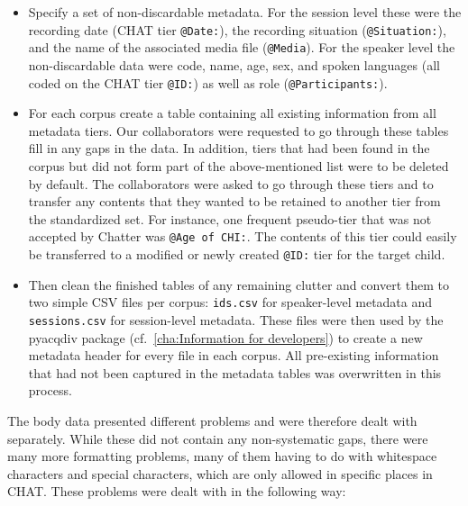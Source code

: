 \documentclass[a4paper, 11pt]{book}
\begin{document}
\begin{itemize}
	\item Specify a set of non-discardable metadata. For the session level these were the recording date (CHAT tier \texttt{@Date:}), the recording situation (\texttt{@Situation:}), and the name of the associated media file
		(\texttt{@Media}). For the speaker level the non-discardable data were code, name, age, sex, and spoken languages (all coded on the CHAT tier \texttt{@ID:}) as well as role (\texttt{@Participants:}). 
	\item For each corpus create a table containing all existing information from all metadata tiers. Our collaborators were requested to go through these tables fill in any gaps in the data. In addition, 
		tiers that had been found in the corpus but did not form part of the above-mentioned list were to be deleted by default. The collaborators were asked to go through these tiers and to transfer any contents
		that they wanted to be retained to another tier from the standardized set. For instance, one frequent pseudo-tier that was not accepted by Chatter was \texttt{@Age of CHI:}. The contents of this tier
		could easily be transferred to a modified or newly created \texttt{@ID:} tier for the target child. 
	\item Then clean the finished tables of any remaining clutter and convert them to two simple CSV files per corpus: \texttt{ids.csv} for speaker-level metadata and \texttt{sessions.csv} for session-level metadata. 
		These files were then used by the pyacqdiv package (cf.\ \autoref{cha:Information for developers}) to create a new metadata header for every file in each corpus. All pre-existing information that had not been 
		captured in the metadata tables was overwritten in this process. 
\end{itemize}

The body data presented different problems and were therefore dealt with separately. While these did not contain any non-systematic gaps, there were many more formatting problems, many of them having to do with whitespace characters and special characters, which are only allowed in specific places in CHAT. These problems were dealt with in the following way: 
\end{document}
